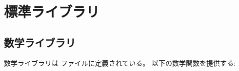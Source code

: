 \documentclass[\pformat,12pt]{jarticle}
\begin{document}
\newpage

\section{標準ライブラリ}\label{stdlib}

\subsection{数学ライブラリ}

数学ライブラリは  ファイルに定義されている。
以下の数学関数を提供する:
\end{document}
